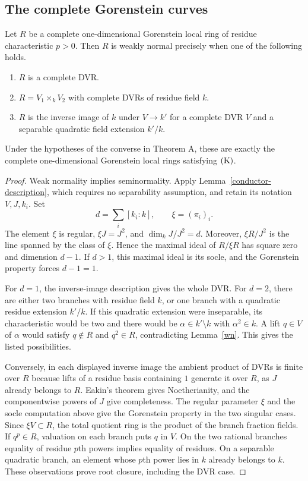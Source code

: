 \subsection{The complete Gorenstein curves}\label{forms}
\begin{corollary}\label{list}
Let $R$ be a complete one-dimensional Gorenstein local ring of residue characteristic $p>0$. Then $R$ is weakly normal precisely when one of the following holds.
\begin{enumerate}
\item $R$ is a complete DVR.
\item $R=V_1\times_k V_2$ with complete DVRs of residue field $k$.
\item $R$ is the inverse image of $k$ under $V\to k'$ for a complete DVR $V$ and a separable quadratic field extension $k'/k$.
\end{enumerate}
Under the hypotheses of the converse in Theorem A, these are exactly
the complete one-dimensional Gorenstein local rings satisfying $\mathrm{(K)}$.
\end{corollary}
\begin{proof}
Weak normality implies seminormality.  Apply
Lemma~\ref{conductor-description}, which requires no separability
assumption, and retain its notation $V,J,k_i$.  Set
\[
 d=\sum_i[k_i:k],\qquad \xi=(\pi_i)_i.
\]
The element $\xi$ is regular, $\xi J=J^2$, and
$\dim_kJ/J^2=d$.  Moreover, $\xi R/J^2$ is the line spanned by the
class of $\xi$.  Hence the maximal ideal of $R/\xi R$ has square
zero and dimension $d-1$.  If $d>1$, this maximal ideal is its socle,
and the Gorenstein property forces $d-1=1$.

For $d=1$, the inverse-image description gives the whole DVR.  For
$d=2$, there are either two branches with residue field $k$, or one
branch with a quadratic residue extension $k'/k$.  If this quadratic
extension were inseparable, its characteristic would be two and
there would be $\alpha\in k'\setminus k$ with $\alpha^2\in k$.
A lift $q\in V$ of $\alpha$ would satisfy $q\notin R$ and $q^2\in R$,
contradicting Lemma~\ref{wn}.  This gives the listed possibilities.

Conversely, in each displayed inverse image the ambient product of DVRs is finite over $R$ because lifts of a residue basis containing $1$ generate it over $R$, as $J$ already belongs to $R$. Eakin's theorem gives Noetherianity, and the componentwise powers of $J$ give completeness. The regular parameter $\xi$ and the socle computation above give the Gorenstein property in the two singular cases. Since $\xi V\subset R$, the total quotient ring is the product of the branch fraction fields. If $q^p\in R$, valuation on each branch puts $q$ in $V$. On the two rational branches equality of residue $p$th powers implies equality of residues. On a separable quadratic branch, an element whose $p$th power lies in $k$ already belongs to $k$. These observations prove root closure, including the DVR case.
\end{proof}

